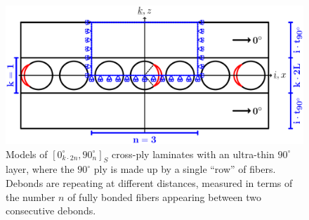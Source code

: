 \documentclass[review]{elsarticle}
\begin{document}
\begin{figure}[!h]
\centering
  \includegraphics[width=\textwidth]{thinPly.pdf}
\caption{Models of $\left[0_{k\cdot2n}^{\circ},90_{n}^{\circ}\right]_{S}$ cross-ply laminates with an ultra-thin $90^{\circ}$ layer, where the $90^{\circ}$ ply is made up by a single ``row'' of fibers. Debonds are repeating at different distances, measured in terms of the number $n$ of fully bonded fibers appearing between two consecutive debonds.}\label{fig:laminateModelsA}
\end{figure}
\end{document}
